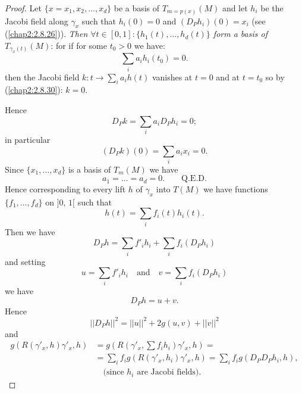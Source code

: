 \begin{proof}
Let $\{x=x_{1},x_{2},\ldots,x_{d}\}$ be a basis of $T_{m=p(x)}(M)$ and
let $h_{i}$ be the Jacobi field along $\gamma_{x}$ such that
$h_{i}(0)=0$ and $(D_{P}h_{i})(0)=x_{i}$ (see
(\ref{chap2:2.8.26})). {\em Then $\forall t\in
  [0,1]:\{h_{1}(t),\ldots,h_{d}(t)\}$ form a basis of}
$T_{\gamma_{x}(t)}(M)$: for if for some $t_{0}>0$ we have:
$$
\sum_{i}a_{i}h_{i}(t_{0})=0.
$$
then \pageoriginale the Jacobi field $k:t\to \sum\limits_{i}a_{i}h(t)$
vanishes at $t=0$ and at $t=t_{0}$ so by (\ref{chap2:2.8.30}): $k=0$.

Hence
$$
D_{P}k=\sum_{i}a_{i}D_{P}h_{i}=0;
$$
in particular
$$
(D_{P}k)(0)=\sum\limits_{i}a_{i}x_{i}=0.
$$
Since $\{x_{1},\ldots,x_{d}\}$ is a basis of $T_{m}(M)$ we have
$$
a_{1}=\ldots=a_{d}=0.\qquad\text{Q.E.D.}
$$
Hence corresponding to every lift $h$ of $\gamma_{x}$ into $T(M)$ we
have functions $\{f_{1},\ldots,f_{d}\}$ on $]0$, $1[$ such that
\begin{equation*}
h(t)=\sum_{i}f_{i}(t)h_{i}(t).\tag{8.2.3}\label{chap8:8.2.3}
\end{equation*}
Then we have
$$
D_{P}h=\sum_{i}f'_{i}h_{i}+\sum_{i}f_{i}(D_{P}h_{i})
$$
and setting
\begin{equation*} 
u=\sum_{i}f'_{i}h_{i}\quad\text{and}\quad
v=\sum_{i}f_{i}(D_{P}h_{i})\tag{8.2.4}\label{chap8:8.2.4} 
\end{equation*}
we have
$$
D_{P}h=u+v.
$$
Hence
\begin{equation*}
||D_{P}h||^{2}=||u||^{2}+2g(u,v)+||v||^{2}\tag{8.2.5}\label{chap8:8.2.5}
\end{equation*}
and
\begin{align*}
g(R(\gamma'_{x},h)\gamma'_{x},h) &= g(R(\gamma'_{x},\sum
f_{i}h_{i})\gamma'_{x},h)=\tag{8.2.6}\label{chap8:8.2.6}\\
&=\sum_{i}f_{i}g(R(\gamma'_{x},h_{i})\gamma'_{x},h)=\sum_{i}f_{i}g(D_{P}D_{P}h_{i},h),\\
&\quad \text{(since $h_{i}$ are Jacobi fields).}
\end{align*}
\end{proof}

\setcounter{subsection}{5}
